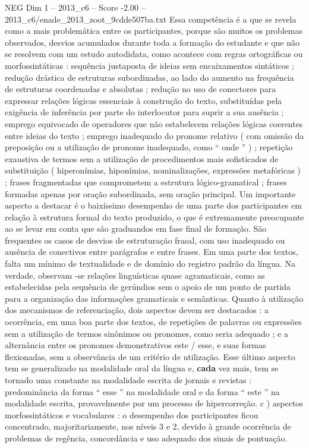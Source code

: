 \begin{textsample}{NEG Dim 1 – 2013\_c6 – Score -2.00 – 2013\_c6/enade\_2013\_zoot\_9cdde507ba.txt}
Essa competência é a que se revela como a mais problemática entre os participantes, porque são muitos os problemas observados, desvios acumulados durante toda a formação do estudante e que não se resolvem com um estudo autodidata, como acontece com regras ortográficas ou morfossintáticas : sequência justaposta de ideias sem encaixamentos sintáticos ; redução drástica de estruturas subordinadas, ao lado do aumento na frequência de estruturas coordenadas e absolutas ; redução no uso de conectores para expressar relações lógicas essenciais à construção do texto, substituídas pela exigência de inferência por parte do interlocutor para suprir a sua ausência ; emprego equivocado de operadores que não estabelecem relações lógicas coerentes entre ideias do texto ; emprego inadequado do pronome relativo ( com omissão da preposição ou a utilização de pronome inadequado, como “ onde ” ) ; repetição exaustiva de termos sem a utilização de procedimentos mais sofisticados de substituição ( hiperonímias, hiponímias, nominalizações, expressões metafóricas ) ; frases fragmentadas que comprometem a estrutura lógico-gramatical ; frases formadas apenas por oração subordinada, sem oração principal.
Um importante aspecto a destacar é o baixíssimo desempenho de uma parte dos participantes em relação à estrutura formal do texto produzido, o que é extremamente preocupante ao se levar em conta que são graduandos em fase final de formação.
São frequentes os casos de desvios de estruturação frasal, com uso inadequado ou ausência de conectivos entre parágrafos e entre frases.
Em uma parte dos textos, falta um mínimo de textualidade e de domínio do registro padrão da língua.
Na verdade, observam -se relações linguísticas quase agramaticais, como as estabelecidas pela sequência de gerúndios sem o apoio de um ponto de partida para a organização das informações gramaticais e semânticas.
Quanto à utilização dos mecanismos de referenciação, dois aspectos devem ser destacados : a ocorrência, em uma boa parte dos textos, de repetições de palavras ou expressões sem a utilização de termos sinônimos ou pronomes, como seria adequado ; e a alternância entre os pronomes demonstrativos este / esse, e suas formas flexionadas, sem a observância de um critério de utilização.
Esse último aspecto tem se generalizado na modalidade oral da língua e, \textbf{cada} vez mais, tem se tornado uma constante na modalidade escrita de jornais e revistas : predominância da forma “ esse ” na modalidade oral e da forma “ este ” na modalidade escrita, provavelmente por um processo de hipercorreção. c ) aspectos morfossintáticos e vocabulares : o desempenho dos participantes ficou concentrado, majoritariamente, nos níveis 3 e 2, devido à grande ocorrência de problemas de regência, concordância e uso adequado dos sinais de pontuação.

\end{textsample}
